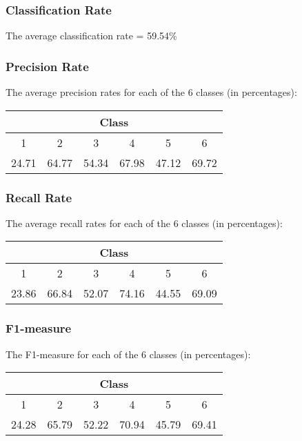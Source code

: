 \documentclass[a4paper,11pt]{article}
\begin{document}
\subsubsection{Classification Rate}

The average classification rate = 59.54\%

\subsubsection{Precision Rate}

The average precision rates for each of the 6 classes (in percentages):

\begin{center}
 \begin{tabular}{| c | c | c | c | c | c |} 
 \hline
 \multicolumn{6}{|c|}{Class} \\
 \hline
  1 & 2 & 3 & 4 & 5 & 6 \\  [1ex]
 \hline
 24.71 & 64.77 & 54.34 & 67.98 & 47.12 & 69.72 \\ 
 \hline
 \end{tabular}
\end{center}

\subsubsection{Recall Rate}

The average recall rates for each of the 6 classes (in percentages):

\begin{center}
 \begin{tabular}{| c | c | c | c | c | c |} 
 \hline
 \multicolumn{6}{|c|}{Class} \\
 \hline
  1 & 2 & 3 & 4 & 5 & 6 \\  [1ex]
 \hline
 23.86 & 66.84 & 52.07 & 74.16 & 44.55 & 69.09 \\ 
 \hline
 \end{tabular}
\end{center}

\subsubsection{F1-measure}

The F1-measure for each of the 6 classes (in percentages):

\begin{center}
 \begin{tabular}{|| c | c | c | c | c | c||} 
 \hline
 \multicolumn{6}{|c|}{Class} \\
 \hline
  1 & 2 & 3 & 4 & 5 & 6 \\  [1ex]
 \hline
 24.28 & 65.79 & 52.22 & 70.94 & 45.79 & 69.41 \\ 
 \hline
 \end{tabular}
\end{center}
\end{document}
